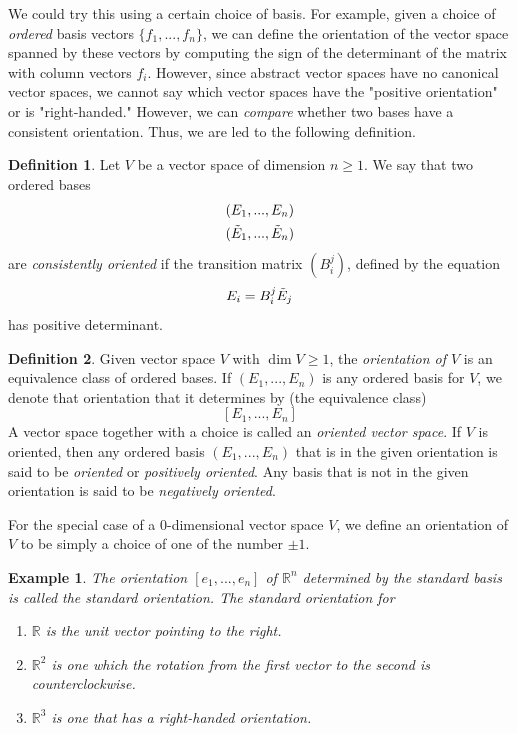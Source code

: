 \documentclass{article}
\newtheorem{example}{Example}[section]
\theoremstyle{remark}
\theoremstyle{definition}
\newtheorem{definition}{Definition}[section]
\begin{document}
We could try this using a certain choice of basis. For example, given a choice of \textit{ordered} basis vectors $\{f_1, ..., f_n\}$, we can define the orientation of the vector space spanned by these vectors by computing the sign of the determinant of the matrix with column vectors $f_i$. However, since abstract vector spaces have no canonical vector spaces, we cannot say which vector spaces have the "positive orientation" or is "right-handed." However, we can \textit{compare} whether two bases have a consistent orientation. Thus, we are led to the following definition. 

\begin{definition}
Let $V$ be a vector space of dimension $n \geq 1$. We say that two ordered bases 
\begin{align*}
    & (E_1, ..., E_n) \\
    & (\Tilde{E}_1, ..., \Tilde{E}_n)
\end{align*}
are \textit{consistently oriented} if the transition matrix $(B^j_i)$, defined by the equation
\[E_i = B^j_i \Tilde{E}_j\]
has positive determinant. 
\end{definition}

\begin{definition}
Given vector space $V$ with $\dim{V} \geq 1$, the \textit{orientation of $V$} is an equivalence class of ordered bases. If $(E_1, ..., E_n)$ is any ordered basis for $V$, we denote that orientation that it determines by (the equivalence class)
\[[E_1, ..., E_n]\]
A vector space together with a choice is called an \textit{oriented vector space}. If $V$ is oriented, then any ordered basis $(E_1, ..., E_n)$ that is in the given orientation is said to be \textit{oriented} or \textit{positively oriented}. Any basis that is not in the given orientation is said to be \textit{negatively oriented}. 

For the special case of a $0$-dimensional vector space $V$, we define an orientation of $V$ to be simply a choice of one of the number $\pm 1$. 
\end{definition}

\begin{example}
The orientation $[e_1, ..., e_n]$ of $\mathbb{R}^n$ determined by the standard basis is called the \textit{standard orientation}. The standard orientation for
\begin{enumerate}
    \item $\mathbb{R}$ is the unit vector pointing to the right. 
    \item $\mathbb{R}^2$ is one which the rotation from the first vector to the second is counterclockwise. 
    \item $\mathbb{R}^3$ is one that has a right-handed orientation. 
\end{enumerate}
\end{example}
\end{document}
